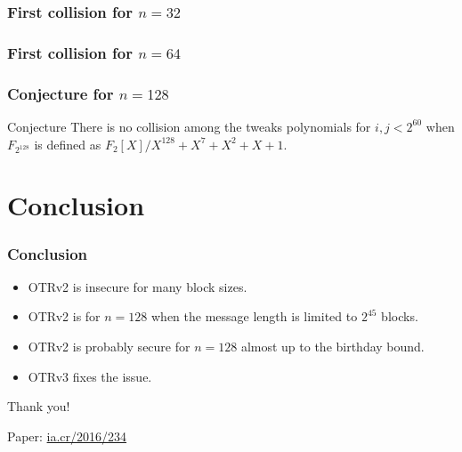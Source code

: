 \documentclass{beamer}
\begin{document}
	\begin{frame}
		\frametitle{First collision for $n=32$}
		
		\centering
		\scalebox{0.8}{
			
			}
	\end{frame}
	\begin{frame}
		\frametitle{First collision for $n=64$}
		
		\centering
		\scalebox{0.8}{
			
			}
	\end{frame}


	\begin{frame}
		\frametitle{Conjecture for $n=128$}
		
		\begin{block}{Conjecture}
			There is no collision among the tweaks polynomials for $i, j < 2^{60}$ when $F_{2^{128}}$ is defined as $F_2[X]/X^{128}+X^{7}+X^{2}+X+1$.
		\end{block}
	\end{frame}


\section*{Conclusion} %
\label{sec:conclusion}

	\begin{frame}
		\frametitle{Conclusion}
		
		\begin{itemize}
			\item OTRv2 is insecure for many block sizes.
			\item OTRv2 is for $n = 128$ when the message length is limited to $2^{45}$ blocks.
			\item OTRv2 is probably secure for $n = 128$ almost up to the birthday bound.
			\item OTRv3 fixes the issue.
		\end{itemize}
	\end{frame}


	\begin{frame}

		\begin{center}
			{\Large Thank you!}
			
			\vspace{1cm}
			Paper: \href{http://ia.cr/2016/234}{ia.cr/2016/234}
		\end{center}
	\end{frame}
	
\end{document}
